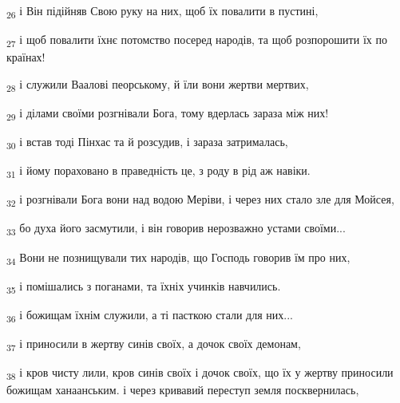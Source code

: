 \begin{tcolorbox}
\textsubscript{26} і Він підійняв Свою руку на них, щоб їх повалити в пустині,
\end{tcolorbox}
\begin{tcolorbox}
\textsubscript{27} і щоб повалити їхнє потомство посеред народів, та щоб розпорошити їх по країнах!
\end{tcolorbox}
\begin{tcolorbox}
\textsubscript{28} і служили Ваалові пеорському, й їли вони жертви мертвих,
\end{tcolorbox}
\begin{tcolorbox}
\textsubscript{29} і ділами своїми розгнівали Бога, тому вдерлась зараза між них!
\end{tcolorbox}
\begin{tcolorbox}
\textsubscript{30} і встав тоді Пінхас та й розсудив, і зараза затрималась,
\end{tcolorbox}
\begin{tcolorbox}
\textsubscript{31} і йому пораховано в праведність це, з роду в рід аж навіки.
\end{tcolorbox}
\begin{tcolorbox}
\textsubscript{32} і розгнівали Бога вони над водою Меріви, і через них стало зле для Мойсея,
\end{tcolorbox}
\begin{tcolorbox}
\textsubscript{33} бо духа його засмутили, і він говорив нерозважно устами своїми...
\end{tcolorbox}
\begin{tcolorbox}
\textsubscript{34} Вони не познищували тих народів, що Господь говорив їм про них,
\end{tcolorbox}
\begin{tcolorbox}
\textsubscript{35} і помішались з поганами, та їхніх учинків навчились.
\end{tcolorbox}
\begin{tcolorbox}
\textsubscript{36} і божищам їхнім служили, а ті пасткою стали для них...
\end{tcolorbox}
\begin{tcolorbox}
\textsubscript{37} і приносили в жертву синів своїх, а дочок своїх демонам,
\end{tcolorbox}
\begin{tcolorbox}
\textsubscript{38} і кров чисту лили, кров синів своїх і дочок своїх, що їх у жертву приносили божищам ханаанським. і через кривавий переступ земля посквернилась,
\end{tcolorbox}
